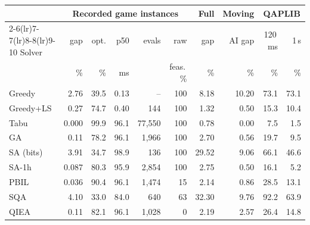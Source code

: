 \begin{tabular}{lrrrrrrrrr}
\toprule
 & \multicolumn{5}{c}{Recorded game instances} & Full & Moving & \multicolumn{2}{c}{QAPLIB} \\
\cmidrule(lr){2-6}\cmidrule(lr){7-7}\cmidrule(lr){8-8}\cmidrule(lr){9-10}
Solver & gap & opt. & p50 & evals & raw & gap & AI gap & 120\,ms & 1\,s \\
 & \% & \% & ms & & feas.\,\% & \% & \% & \% & \% \\
\midrule
Greedy & 2.76 & 39.5 & 0.13 & -- & 100 & 8.18 & 10.20 & 73.1 & 73.1 \\
Greedy+LS & 0.27 & 74.7 & 0.40 & 144 & 100 & 1.32 & 0.50 & 15.3 & 10.4 \\
Tabu & 0.000 & 99.9 & 96.1 & 77{,}550 & 100 & 0.78 & 0.00 & 7.5 & 1.5 \\
GA & 0.11 & 78.2 & 96.1 & 1{,}966 & 100 & 2.70 & 0.56 & 19.7 & 9.5 \\
SA (bits) & 3.91 & 34.7 & 98.9 & 136 & 100 & 29.52 & 9.06 & 66.1 & 46.6 \\
SA-1h & 0.087 & 80.3 & 95.9 & 2{,}854 & 100 & 2.75 & 0.50 & 16.1 & 5.2 \\
PBIL & 0.036 & 90.4 & 96.1 & 1{,}474 & 15 & 2.14 & 0.86 & 28.5 & 13.1 \\
SQA & 4.10 & 33.0 & 84.0 & 640 & 63 & 32.30 & 9.76 & 92.2 & 63.9 \\
QIEA & 0.11 & 82.1 & 96.1 & 1{,}028 & 0 & 2.19 & 2.57 & 26.4 & 14.8 \\
\bottomrule
\end{tabular}
